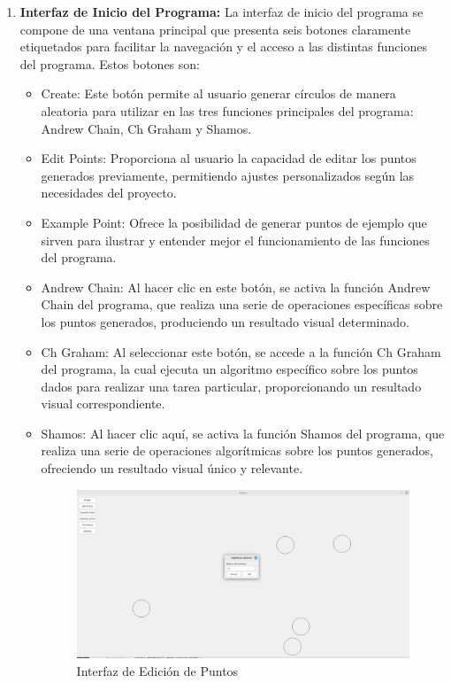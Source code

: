 \documentclass[conference]{IEEEtran}
\begin{document}
\begin{enumerate}

    \item \textbf{Interfaz de Inicio del Programa:}
La interfaz de inicio del programa se compone de una ventana principal que presenta seis botones claramente etiquetados para facilitar la navegación y el acceso a las distintas funciones del programa. Estos botones son:
    \begin{itemize}
        \item Create: Este botón permite al usuario generar círculos de manera aleatoria para utilizar en las tres funciones principales del programa: Andrew Chain, Ch Graham y Shamos.

        \item Edit Points: Proporciona al usuario la capacidad de editar los puntos generados previamente, permitiendo ajustes personalizados según las necesidades del proyecto.

        \item Example Point: Ofrece la posibilidad de generar puntos de ejemplo que sirven para ilustrar y entender mejor el funcionamiento de las funciones del programa.

        \item Andrew Chain: Al hacer clic en este botón, se activa la función Andrew Chain del programa, que realiza una serie de operaciones específicas sobre los puntos generados, produciendo un resultado visual determinado.

        \item Ch Graham: Al seleccionar este botón, se accede a la función Ch Graham del programa, la cual ejecuta un algoritmo específico sobre los puntos dados para realizar una tarea particular, proporcionando un resultado visual correspondiente.

        \item Shamos: Al hacer clic aquí, se activa la función Shamos del programa, que realiza una serie de operaciones algorítmicas sobre los puntos generados, ofreciendo un resultado visual único y relevante.

\begin{figure}[h]
    \centering
    \includegraphics[width=0.8\linewidth]{images/1.png}
    \caption{Interfaz de Edición de Puntos}
    \label{fig:interfaz_edicion_puntos}
    \end{figure}
\end{itemize}



\end{enumerate}
\end{document}
